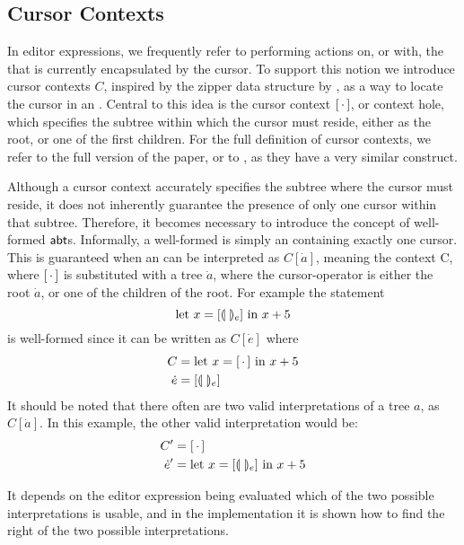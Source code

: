 \documentclass[sigplan,screen]{acmart}
\begin{document}
\subsection{Cursor Contexts}
In editor expressions, we frequently refer to performing actions on,
or with, the \abt that is currently encapsulated by the cursor. To
support this notion we introduce cursor contexts $C$, inspired by the
zipper data structure by \cite{huet_zipper}, as a way to locate the
cursor in an \abt. Central to this idea is the cursor context
$[ \, \cdot \, ]$, or context hole, which specifies the subtree within which
the cursor must reside, either as the root, or one of the first
children.  For the full definition of cursor contexts, we refer to the
full version of the paper, or to \cite{type_safe_structure_editor}, as
they have a very similar construct. 

Although a cursor context accurately specifies the subtree where the
cursor must reside, it does not inherently guarantee the presence of
only one cursor within that subtree. Therefore, it becomes necessary
to introduce the concept of well-formed $\textsf{abt}$s. Informally, a
well-formed \abt is simply an \abt containing exactly one cursor. This
is guaranteed when an \abt can be interpreted as $C[\dot{a}]$, meaning
the context C, where $[ \, \cdot \, ]$ is substituted with a tree $\dot{a}$,
where the cursor-operator is either the root $\dot{a}$, or one of the
children of the root. For example the statement 
    \begin{equation*}
        \text{let $x=[\llparenthesis \ \rrparenthesis_e]$ in $x+5$}
    \end{equation*}
    is well-formed since it can be written as $C[\dot{e}]$ where
    \begin{align*}
        C &= \text{let $x=[ \, \cdot \, ]$ in $x+5$} \\
        \dot{e}&= [\llparenthesis \ \rrparenthesis_e]
    \end{align*}
%
It should be noted that there often are two valid interpretations of a
tree $a$, as $C[\dot{a}]$. In this example, the other valid
interpretation would be: 
%
\begin{align*}
        C' &= [ \, \cdot \, ] \\
        \dot{e}' &= \text{let $x=[\llparenthesis \ \rrparenthesis_e]$ in $x+5$}
\end{align*}

It depends on the editor expression being evaluated which of the two
possible interpretations is usable, and in the implementation it is
shown how to find the right of the two possible interpretations.
\end{document}
